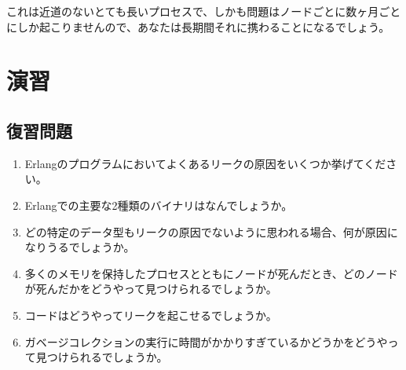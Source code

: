 これは近道のないとても長いプロセスで、しかも問題はノードごとに数ヶ月ごとにしか起こりませんので、あなたは長期間それに携わることになるでしょう。


\section{演習}

\subsection*{復習問題}

\begin{enumerate}
  \item Erlangのプログラムにおいてよくあるリークの原因をいくつか挙げてください。
  \item Erlangでの主要な2種類のバイナリはなんでしょうか。
  \item どの特定のデータ型もリークの原因でないように思われる場合、何が原因になりうるでしょうか。
  \item 多くのメモリを保持したプロセスとともにノードが死んだとき、どのノードが死んだかをどうやって見つけられるでしょうか。
  \item コードはどうやってリークを起こせるでしょうか。
  \item ガベージコレクションの実行に時間がかかりすぎているかどうかをどうやって見つけられるでしょうか。
\end{enumerate}

